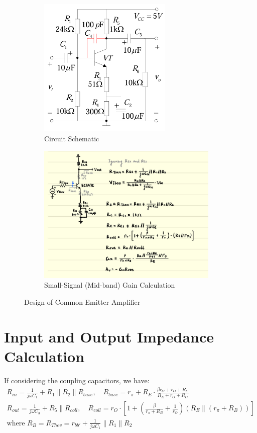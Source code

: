 \documentclass[UTF8]{article}
\begin{document}
\begin{figure}[H]\centering
\begin{subfigure}[b]{0.5\columnwidth}\centering
    \includegraphics[height=190pt]{preview/assets/CE.png}
    \caption{Circuit Schematic}
\end{subfigure}\hfill
\begin{subfigure}[b]{0.5\columnwidth}\centering
    \includegraphics[height=190pt]{preview/assets/Gain.png}
    \caption{Small-Signal (Mid-band) Gain Calculation}
\end{subfigure}
\caption{Design of Common-Emitter Amplifier}
\end{figure}

\section{Input and Output Impedance Calculation}

\noindent 
If considering the coupling capacitors, we have:
\begin{gather}
R_{in} = \frac{1}{j \omega C_1} + R_1 \parallel R_2 \parallel R_{base},\quad 
R_{base} = r_{\pi} + R_E \cdot \frac{\beta r_O + r_O + R_C}{R_E + r_O + R_C}
\\ 
R_{out} = \frac{1}{j \omega C_3} + R_5 \parallel R_{coll},\quad 
R_{coll} = r_O \cdot \left[ 1 + \left(\frac{\beta}{r_{\pi} + R_B} + \frac{1}{r_O}\right)\left(R_E \parallel (r_{\pi} + R_B)\right) \right]
\\
\text{where\ \ }
R_B = R_{Thev} = r_{bb'} + \frac{1}{j \omega C_{1}} \parallel R_1 \parallel R_2
\end{gather}
\end{document}
